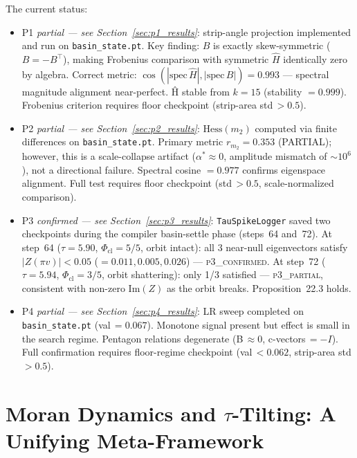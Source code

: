 \documentclass[11pt]{amsart}
\begin{document}
The current status:
\begin{itemize}
\item P1 \emph{partial --- see Section~\ref{sec:p1_results}}:
  strip-angle projection implemented and run on \texttt{basin\_state.pt}.
  Key finding: $B$ is exactly skew-symmetric ($B=-B^\top$), making
  Frobenius comparison with symmetric $\hat{H}$ identically zero by
  algebra.
  Correct metric: $\cos(|\mathrm{spec}\,\hat{H}|, |\mathrm{spec}\,B|)
  = 0.993$ --- spectral magnitude alignment near-perfect.
  Ĥ stable from $k=15$ (stability $= 0.999$).
  Frobenius criterion requires floor checkpoint (strip-area std\,$>0.5$).
\item P2 \emph{partial --- see Section~\ref{sec:p2_results}}:
  $\mathrm{Hess}(m_2)$ computed via finite differences on
  \texttt{basin\_state.pt}.
  Primary metric $r_{m_2} = 0.353$ (PARTIAL); however, this is
  a scale-collapse artifact ($\alpha^* \approx 0$, amplitude
  mismatch of $\sim 10^6$), not a directional failure.
  Spectral cosine $= 0.977$ confirms eigenspace alignment.
  Full test requires floor checkpoint (std\,$>0.5$,
  scale-normalized comparison).
\item P3 \emph{confirmed --- see Section~\ref{sec:p3_results}}:
  \texttt{TauSpikeLogger} saved two checkpoints during the compiler
  basin-settle phase (steps~64 and~72).
  At step~64 ($\tau=5.90$, $\Phi_\mathrm{cl}=5/5$, orbit intact):
  all 3 near-null eigenvectors satisfy $|Z(\pi v)| < 0.05$
  ($= 0.011, 0.005, 0.026$) --- \textsc{p3\_confirmed}.
  At step~72 ($\tau=5.94$, $\Phi_\mathrm{cl}=3/5$, orbit shattering):
  only 1/3 satisfied --- \textsc{p3\_partial}, consistent with
  non-zero $\mathrm{Im}(Z)$ as the orbit breaks.
  Proposition~22.3 holds.
\item P4 \emph{partial --- see Section~\ref{sec:p4_results}}:
  LR sweep completed on \texttt{basin\_state.pt} (val\,$=0.067$).
  Monotone signal present but effect is small in the search regime.
  Pentagon relations degenerate (B\,$\approx 0$, c-vectors\,$= -I$).
  Full confirmation requires floor-regime checkpoint (val\,$<0.062$,
  strip-area std\,$>0.5$).
\end{itemize}

\section{Moran Dynamics and $\tau$-Tilting: A Unifying Meta-Framework}
\label{sec:moran_tilting}
\end{document}
